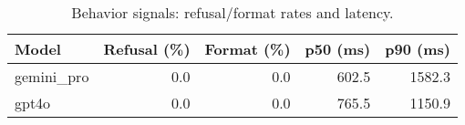 \begin{table}[t]\centering
\caption{Behavior signals: refusal/format rates and latency.}
\label{tab:behavior}
\begin{tabular}{lrrrr}
\toprule
Model & Refusal (\%) & Format (\%) & p50 (ms) & p90 (ms) \\
\midrule
gemini_pro & 0.0 & 0.0 & 602.5 & 1582.3 \\
gpt4o & 0.0 & 0.0 & 765.5 & 1150.9 \\
\bottomrule
\end{tabular}
\end{table}
